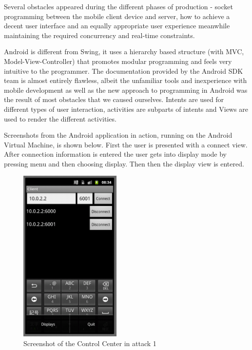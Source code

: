 \documentclass[8pt,titlepage]{article}
\begin{document}
Several obstacles appeared during the different phases of production - socket programming between the mobile client device and server, how to achieve a decent user interface and an equally appropriate user experience meanwhile maintaining the required concurrency and real-time constraints. 

Android is different from Swing, it uses a hierarchy based structure (with MVC, Model-View-Controller) that promotes modular programming and feels very intuitive to the programmer. The documentation provided by the Android SDK team is almost entirely flawless, albeit the unfamiliar tools and inexperience with mobile development as well as the new approach to programming in Android was the result of most obstacles that we caused ourselves.
Intents are used for different types of user interaction, activities are subparts of intents and Views are used to render the different activities. 

Screenshots from the Android application in action, running on the Android Virtual Machine, is shown below. First the user is presented with a connect view. After connection information is entered the user gets into display mode by pressing menu and then choosing display. Then then the display view is entered.

\begin{figure}[hbp]
\includegraphics[width=0.45\textwidth]{../screenshots/androidConnecting.png}
\caption{Screenshot of the Control Center in attack 1}
\end{figure}
\end{document}
